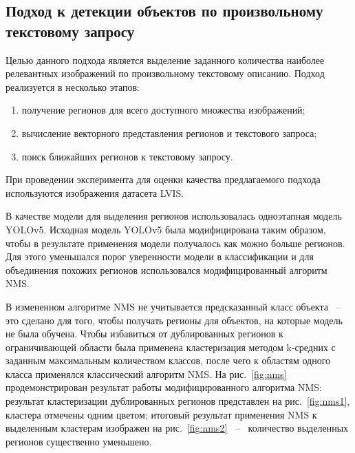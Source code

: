 \documentclass[a4paper,14pt]{article}
\begin{document}
    \subsection{Подход к детекции объектов по произвольному текстовому запросу}
    
    Целью данного подхода является выделение заданного количества наиболее релевантных изображений по произвольному текстовому описанию. 
    Подход реализуется в несколько этапов:
     \begin{enumerate}
    	[1)]
    	\itemsep0em
    	\item получение регионов для всего доступного множества изображений;
    	\item вычисление векторного представления регионов и текстового запроса;
    	\item поиск ближайших регионов к текстовому запросу.
    \end{enumerate}
    
    При проведении эксперимента для оценки качества предлагаемого подхода используются изображения датасета LVIS. 
    
    В качестве модели для выделения регионов использовалась одноэтапная модель YOLOv5. 
    Исходная модель YOLOv5 была модифицирована таким образом, чтобы в результате применения модели получалось как можно больше регионов. 
    Для этого уменьшался порог уверенности модели в классификации и для объединения похожих регионов использовался модифицированный алгоритм NMS. 
    
    В измененном алгоритме NMS не учитывается предсказанный класс объекта ~--~ это сделано для того, чтобы получать регионы  для объектов, на которые модель не была обучена. 
    Чтобы избавиться от дублированных регионов к ограничивающей области была применена кластеризация методом k-средних с заданным максимальным количеством классов, после чего к областям одного класса применялся классический алгоритм NMS. 
    На рис.~\ref{fig:nms} продемонстрирован результат работы модифицированного алгоритма NMS: результат кластеризации дублированных регионов представлен на рис.~\ref{fig:nms1}, кластера отмечены одним цветом; итоговый результат применения NMS к выделенным кластерам изображен на рис.~\ref{fig:nms2} ~--~ количество выделенных регионов существенно уменьшено.
    
\end{document}
